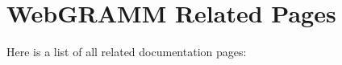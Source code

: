 \section{Web\-GRAMM Related Pages}
Here is a list of all related documentation pages:\begin{CompactList}
\item {}

\end{CompactList}
